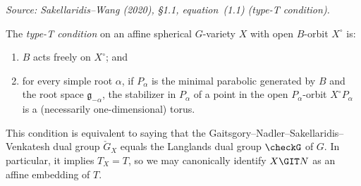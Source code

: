 \begin{definition}
  \label{def:type-T-condition}
  \textit{Source: Sakellaridis--Wang (2020), §1.1, equation~(1.1) (type-T condition).}

  The \emph{type-T condition} on an affine spherical \( G \)-variety \( X \) with open
  \( B \)-orbit \( X^\circ \) is:
  \begin{enumerate}
    \item \( B \) acts freely on \( X^\circ \); and
    \item for every simple root \( \alpha \), if \( P_\alpha \) is the minimal parabolic
          generated by \( B \) and the root space \( \mathfrak{g}_{-\alpha} \), the
          stabilizer in \( P_\alpha \) of a point in the open \( P_\alpha \)-orbit
          \( X^\circ P_\alpha \) is a (necessarily one-dimensional) torus.
  \end{enumerate}
  This condition is equivalent to saying that the Gaitsgory--Nadler--Sakellaridis--Venkatesh
  dual group \( \check{G}_X \) equals the Langlands dual group \( \checkG \) of \( G \).
  In particular, it implies \( T_X = T \), so we may canonically identify \( X \GIT N \) as
  an affine embedding of \( T \).
\end{definition}

